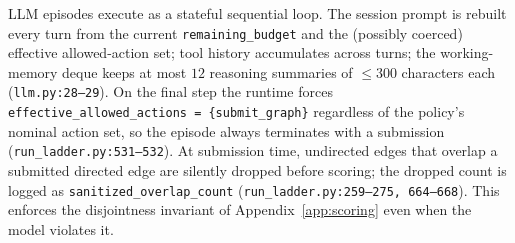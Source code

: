 LLM episodes execute as a stateful sequential loop. The session prompt is rebuilt every turn from the current \texttt{remaining\_budget} and the (possibly coerced) effective allowed-action set; tool history accumulates across turns; the working-memory deque keeps at most $12$ reasoning summaries of $\le 300$ characters each (\texttt{llm.py:28--29}). On the final step the runtime forces \texttt{effective\_allowed\_actions = \{submit\_graph\}} regardless of the policy's nominal action set, so the episode always terminates with a submission (\texttt{run\_ladder.py:531--532}). At submission time, undirected edges that overlap a submitted directed edge are silently dropped before scoring; the dropped count is logged as \texttt{sanitized\_overlap\_count} (\texttt{run\_ladder.py:259--275, 664--668}). This enforces the disjointness invariant of Appendix~\ref{app:scoring} even when the model violates it.
